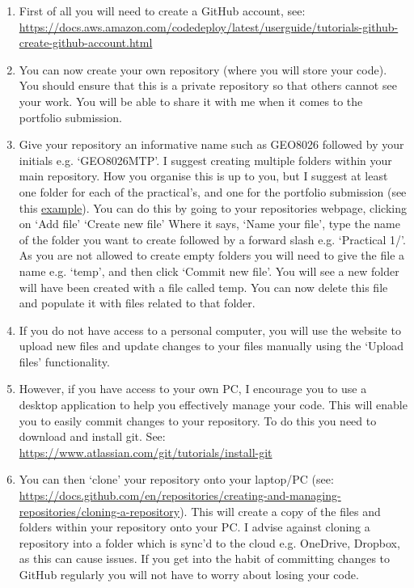 \documentclass[11pt,onecolumn,a4paper,notitlepage]{article}
\begin{document}
\begin{enumerate}
\item{First of all you will need to create a GitHub account, see: \url{https://docs.aws.amazon.com/codedeploy/latest/userguide/tutorials-github-create-github-account.html}}

\item{You can now create your own repository (where you will store your code). You should ensure that this is a private repository so that others cannot see your work. You will be able to share it with me when it comes to the portfolio submission.}

\item{Give your repository an informative name such as GEO8026 followed by your initials e.g. `GEO8026\textunderscore MTP'. I suggest creating multiple folders within your main repository. How you organise this is up to you, but I suggest at least one folder for each of the practical's, and one for the portfolio submission (see this \href{https://github.com/CatchmentSci/GEO8026_22_23}{example}). You can do this by going to your repositories webpage, clicking on `Add file'  `Create new file' Where it says, `Name your file', type the name of the folder you want to create followed by a forward slash e.g. `Practical 1/'. As you are not allowed to create empty folders you will need to give the file a name e.g. `temp', and then click `Commit new file'. You will see a new folder will have been created with a file called temp. You can now delete this file and populate it with files related to that folder.}

\item{If you do not have access to a personal computer, you will use the website to upload new files and update changes to your files manually using the `Upload files' functionality.}

\item{However, if you have access to your own PC, I encourage you to use a desktop application to help you effectively manage your code. This will enable you to easily commit changes to your repository. To do this you need to download and install git. See: \url{https://www.atlassian.com/git/tutorials/install-git}}

\item{You can then `clone' your repository onto your laptop/PC (see: \url{https://docs.github.com/en/repositories/creating-and-managing-repositories/cloning-a-repository}). This will create a copy of the files and folders within your repository onto your PC. I advise against cloning a repository into a folder which is sync'd to the cloud e.g. OneDrive, Dropbox, as this can cause issues. If you get into the habit of committing changes to GitHub regularly you will not have to worry about losing your code.}


\end{enumerate}
\end{document}
